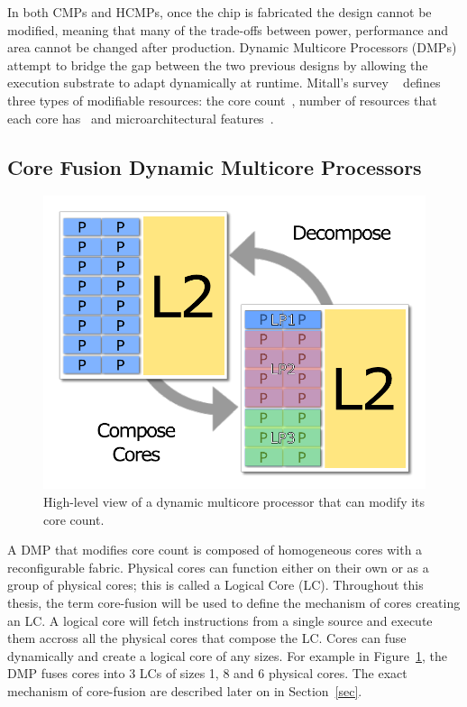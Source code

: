 
In both CMPs and HCMPs, once the chip is fabricated the design cannot be modified, meaning that many of the trade-offs between power, performance and area cannot be changed after production.
Dynamic Multicore Processors (DMPs) attempt to bridge the gap between the two previous designs by allowing the execution substrate to adapt dynamically at runtime.
Mitall's survey ~\cite{MittalSurv2016} defines three types of modifiable resources: the core count~\cite{ipek2007CoreFusion}, number of resources that each core has~\cite{Homayoun3DPooling2012} and microarchitectural features~\cite{fallinhetblock2014,BauerRSE08,tavanaElastic}.

\subsection{Core Fusion Dynamic Multicore Processors}\label{chp:Background:sec:EDGE}

\begin{figure}[t]
    \centering
    \includegraphics[width=.7\textwidth]{streamit-paper/graphics/dmcgraph.pdf}
    \caption{High-level view of a dynamic multicore processor that can modify its core count.}
    \label{fig:dynmulticore}
\end{figure}

A DMP that modifies core count is composed of homogeneous cores with a reconfigurable fabric.
Physical cores can function either on their own or as a group of physical cores; this is called a Logical Core (LC).
Throughout this thesis, the term core-fusion will be used to define the mechanism of cores creating an LC.
A logical core will fetch instructions from a single source and execute them accross all the physical cores that compose the LC.
Cores can fuse dynamically and create a logical core of any sizes.
For example in Figure~\ref{fig:dynmulticore}, the DMP fuses cores into 3 LCs of sizes 1, 8 and 6 physical cores.
The exact mechanism of core-fusion are described later on in Section~\ref{sec}.

